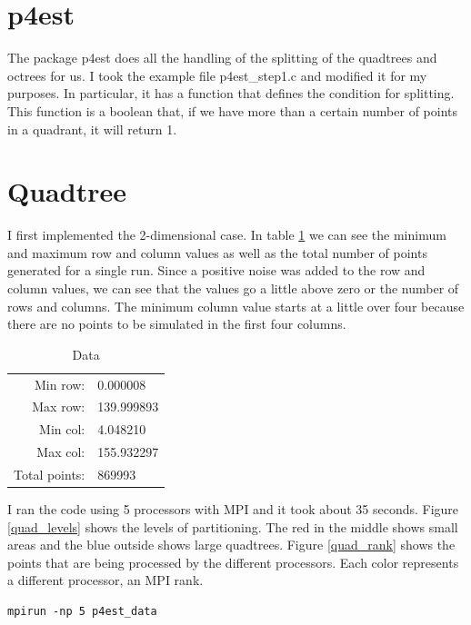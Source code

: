 \documentclass[12pt,letterpaper]{article}
\begin{document}
\section{p4est}

The package p4est does all the handling of the splitting of the quadtrees and octrees for us. I took the example file p4est\_step1.c and modified it for my purposes. In particular, it has a function that defines the condition for splitting. This function is a boolean that, if we have more than a certain number of points in a quadrant, it will return 1.

\section{Quadtree}

I first implemented the 2-dimensional case. In table \ref{data} we can see the minimum and maximum row and column values as well as the total number of points generated for a single run. Since a positive noise was added to the row and column values, we can see that the values go a little above zero or the number of rows and columns. The minimum column value starts at a little over four because there are no points to be simulated in the first four columns.

\begin{table}
\centering
\caption{Data}
\label{data}
\begin{tabular}{rl}
Min row: & 0.000008\\
Max row: & 139.999893\\
Min col: & 4.048210\\
Max col: & 155.932297\\
Total points: & 869993
\end{tabular}
\end{table}

I ran the code using 5 processors with MPI and it took about 35 seconds. Figure \ref{quad_levels} shows the levels of partitioning. The red in the middle shows small areas and the blue outside shows large quadtrees. Figure \ref{quad_rank} shows the points that are being processed by the different processors. Each color represents a different processor, an MPI rank.

\begin{verbatim}
mpirun -np 5 p4est_data
\end{verbatim}
\end{document}
